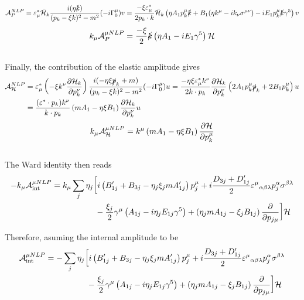 \documentclass{article}
\newcommand{\s}[1]{\slashed #1}
\begin{document}
\begin{equation*}
	\mathcal{A}^{NLP}_P = \varepsilon^*_\mu\bar{\mathcal{H}}_k\frac{i(\eta\s{k})}{(p_k -\xi k)^2 - m^2}(-i\Gamma_0^\mu) v
	= \frac{-\xi\varepsilon^*_\mu}{2 p_k\cdot k}\bar{\mathcal{H}}_k\left(\eta A_1 p_k^\mu\s{k} + B_1 (\eta k^\mu - i k_\nu\sigma^{\mu\nu})- iE_1 p_k^\mu \s{k}\gamma^5\right) v
\end{equation*}
\begin{equation*}
	k_\mu\mathcal{A}^{\mu NLP}_P = \frac{-\xi}{2}\s{k}\left(\eta A_1  - iE_1 \gamma^5\right)\mathcal{H}
\end{equation*}
\\
Finally, the contribution of the elastic amplitude gives
\begin{align*}
	\mathcal{A}^{NLP}_\mathcal{H} &= \varepsilon^*_\mu\left(-\xi k^\nu \pdv{\mathcal{H}_k}{p_k^\nu}\right)\frac{i(-\eta\xi \s{p}_k + m)}{(p_k -\xi k)^2 - m^2}(-i\Gamma_0^\mu) u
	= \frac{-\eta\xi \varepsilon^*_\mu k^\nu}{2 k\cdot p_k} \pdv{\mathcal{H}_k}{p_k^\nu}\left(2A_1p_k^\mu\s{p}_k + 2B_1p_k^\mu\right)u\\&
	=\frac{(\varepsilon^*\cdot p_k) k^\nu}{k\cdot p_k}\left(mA_1-\eta\xi B_1\right) \pdv{\mathcal{H}_k}{p_k^\nu}u
\end{align*}
\begin{equation*}
	k_\mu\mathcal{A}^{\mu NLP}_\mathcal{H}
	=k^\mu \left(mA_1-\eta\xi B_1\right)\pdv{\mathcal{H}}{p_{k}^\mu}
\end{equation*}
\\
The Ward identity then reads
\begin{align*}
	-k_\mu \mathcal{A}^{\mu NLP}_{\mathrm{int}} &
	= k_\mu\sum_j \eta_j\bigg[i\left( B_{1j}'+ B_{3j}-\eta_j\xi_j mA_{1j}'\right) p_j^\mu + i\frac{D_{3j}+D'_{1j}}{2} \varepsilon^{\mu}{}_{\alpha\beta\lambda} p_j^\alpha \sigma^{\beta\lambda} \\&\phantom{=k_\mu\sum_j \eta_j\bigg[}- \frac{\xi_j}{2}\gamma^\mu\left(A_{1j} - i\eta_j E_{1j} \gamma^5\right)+ \left(\eta_j mA_{1j}-\xi_j B_{1j}\right)\pdv{p_{j\mu}}\bigg]\mathcal{H}
\end{align*}
Therefore, asuming the internal amplitude to be
\begin{align*}
\mathcal{A}^{\mu NLP}_{\mathrm{int}} &
=-\sum_j \eta_j\bigg[i\left( B_{1j}'+ B_{3j}-\eta_j\xi_j mA_{1j}'\right) p_j^\mu + i\frac{D_{3j}+D'_{1j}}{2} \varepsilon^{\mu}{}_{\alpha\beta\lambda} p_j^\alpha \sigma^{\beta\lambda} \\&\phantom{=-\sum_j \eta_j\bigg[}- \frac{\xi_j}{2}\gamma^\mu\left(A_{1j} - i\eta_j E_{1j} \gamma^5\right)+ \left(\eta_j mA_{1j}-\xi_j B_{1j}\right)\pdv{p_{j\mu}}\bigg]\mathcal{H}
\end{align*}
\end{document}
